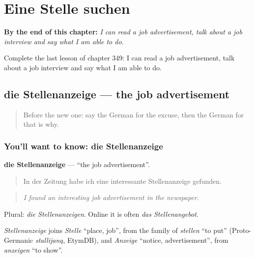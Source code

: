 
\chapter{Eine Stelle suchen}
\label{ch:ge-eine-stelle-suchen}

\begin{chapteropening}
\textbf{By the end of this chapter:} \emph{I can read a job advertisement, talk about a job interview and say what I am able to do.}

Complete the last lesson of chapter 349: I can read a job advertisement, talk about a job interview and say what I am able to do.
\end{chapteropening}

\section[die Stellenanzeige]{die Stellenanzeige — the job advertisement}

\label{lesson:GE-C349-stellenanzeige}



\begin{quote}
Before the new one: say the German for the excuse, then the German for that is why.
\end{quote}

\subsection*{You'll want to know: die Stellenanzeige}
\textbf{die Stellenanzeige} — \textquotedblleft{}the job advertisement\textquotedblright{}.

\begin{quote}
In der Zeitung habe ich eine interessante Stellenanzeige gefunden.
\end{quote}

\begin{quote}
\emph{I found an interesting job advertisement in the newspaper.}
\end{quote}

Plural: \emph{die Stellenanzeigen}. Online it is often \emph{das Stellenangebot}.

\begin{cousinweb}
\emph{Stellenanzeige} joins \emph{Stelle} \textquotedblleft{}place, job\textquotedblright{}, from the family of \emph{stellen} \textquotedblleft{}to put\textquotedblright{} (Proto-Germanic \emph{stallijaną}, EtymDB), and \emph{Anzeige} \textquotedblleft{}notice, advertisement\textquotedblright{}, from \emph{anzeigen} \textquotedblleft{}to show\textquotedblright{}.
\end{cousinweb}

